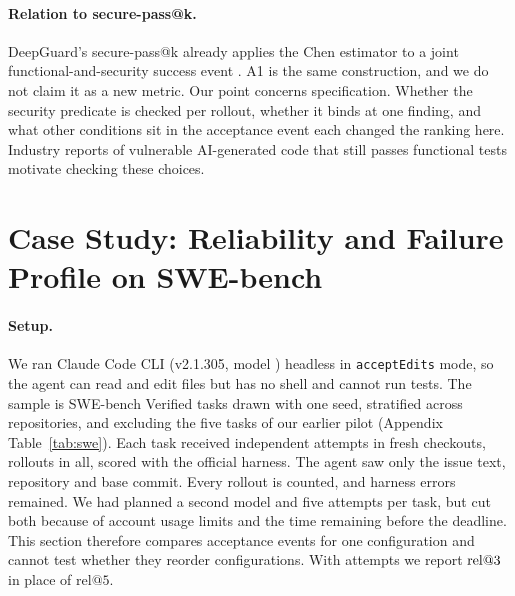 \documentclass[11pt,a4paper]{article}
\makeatletter
\newcommand{\relk}[1]{\mathrm{rel}@#1}
\makeatother
\begin{document}
\paragraph{Relation to secure-pass@k.}
DeepGuard's secure-pass@k already applies the Chen estimator to a joint functional-and-security success event \citep{huang2026deepguard}. A1 is the same construction, and we do not claim it as a new metric. Our point concerns specification. Whether the security predicate is checked per rollout, whether it binds at one finding, and what other conditions sit in the acceptance event each changed the ranking here. Industry reports of vulnerable AI-generated code that still passes functional tests \citep{veracode2025} motivate checking these choices.

\section{Case Study: Reliability and Failure Profile on SWE-bench}
\label{sec:swe}

\paragraph{Setup.}
We ran Claude Code CLI (v2.1.305, model \sweSonnetModels{}) headless in \texttt{acceptEdits} mode, so the agent can read and edit files but has no shell and cannot run tests. The sample is \sweNTasks{} SWE-bench Verified tasks drawn with one seed, stratified across \sweNRepos{} repositories, and excluding the five tasks of our earlier pilot (Appendix Table~\ref{tab:swe}). Each task received \sweAttempts{} independent attempts in fresh checkouts, \sweSonnetRollouts{} rollouts in all, scored with the official harness. The agent saw only the issue text, repository and base commit. Every rollout is counted, and \sweSonnetHarnessErrors{} harness errors remained. We had planned a second model and five attempts per task, but cut both because of account usage limits and the time remaining before the deadline. This section therefore compares acceptance events for one configuration and cannot test whether they reorder configurations. With \sweAttempts{} attempts we report $\relk{\sweAttempts}$ in place of $\relk{5}$.

\begin{table}[htbp]
  \centering
  \small
  
  \par\medskip
  
  \caption{Claude Code on \sweNTasks{} SWE-bench Verified tasks, \sweAttempts{} attempts each. Top: reliability under fail-to-pass (F2P) and resolved acceptance, with 95\% task-bootstrap intervals. Bottom: outcome of each of the \sweSonnetRollouts{} rollouts.}
  \label{tab:swerel}
\end{table}
\end{document}
